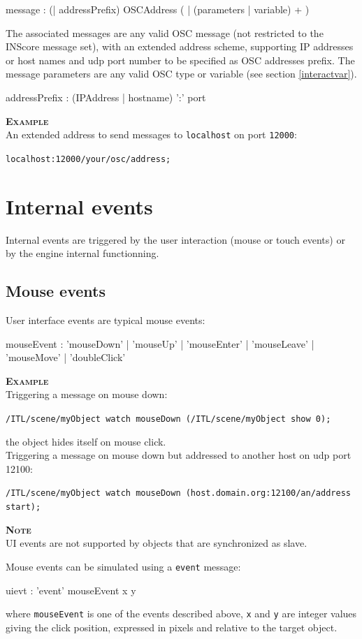 \documentclass[a4paper,twoside]{report}
\newcommand{\sublevel}[1]	{\section{#1}}
\newcommand{\subsublevel}[1]	{\subsection{#1}}
\newcommand{\OSC}[1]		{\texttt{#1}}
\newcommand{\example}		{\textbf{\hspace{-1.5cm}\textbf{\textsc{Example }}}}
\newcommand{\note}	[1]		{\vspace{2mm}\textbf{\hspace{-0.9cm}\textbf{\textsc{Note #1}}}}
\newcommand{\sample}	[1]			{\vspace{-2mm}\begin{center}\colorbox{mygrey}{
								\begin{minipage}[t]{0.9\columnwidth} 
								{\small \texttt{#1}}
								\end{minipage}}\end{center}}
\newcommand{\sampleindent}	{ \hspace{0.5cm} }
\begin{document}
\begin{rail} 
message : (| addressPrefix)  OSCAddress ( | (parameters | variable) + )
\end{rail}

The associated messages are any valid OSC message (not restricted to the INScore message set), with an extended address scheme, supporting IP addresses or host names and udp port number to be specified as OSC addresses prefix. The message parameters are any valid OSC type or variable (see section \ref{interactvar}).


\begin{rail} 
addressPrefix : (IPAddress | hostname) ':' port
\end{rail}

\example \\
An extended address to send messages to \OSC{localhost} on port \OSC{12000}:
\sample{localhost:12000/your/osc/address;}

\sublevel{Internal events}
\label{defevents}

Internal events are triggered by the user interaction (mouse or touch events) or by the engine internal functionning.

\subsublevel{Mouse events}
\label{uievents}

User interface events are typical mouse events:
\begin{rail}
mouseEvent : 'mouseDown' | 'mouseUp' | 'mouseEnter' | 'mouseLeave' | 'mouseMove' | 'doubleClick' 
\end{rail}
	
\example \\
Triggering a message on mouse down:
\sample{/ITL/scene/myObject watch mouseDown (/ITL/scene/myObject show 0);}
\sampleindent the object hides itself on mouse click. \\
Triggering a message on mouse down but addressed to another host on udp port 12100:
\sample{/ITL/scene/myObject watch mouseDown (host.domain.org:12100/an/address start); }

\note{} \\
UI events are not supported by objects that are synchronized as slave.

Mouse events can be simulated using a \OSC{event} message:
\begin{rail}
uievt : 'event' mouseEvent x y
\end{rail}
where \OSC{mouseEvent} is one of the events described above, \OSC{x} and \OSC{y} are integer values giving the click position, expressed in pixels and relative to the target object.
\end{document}
